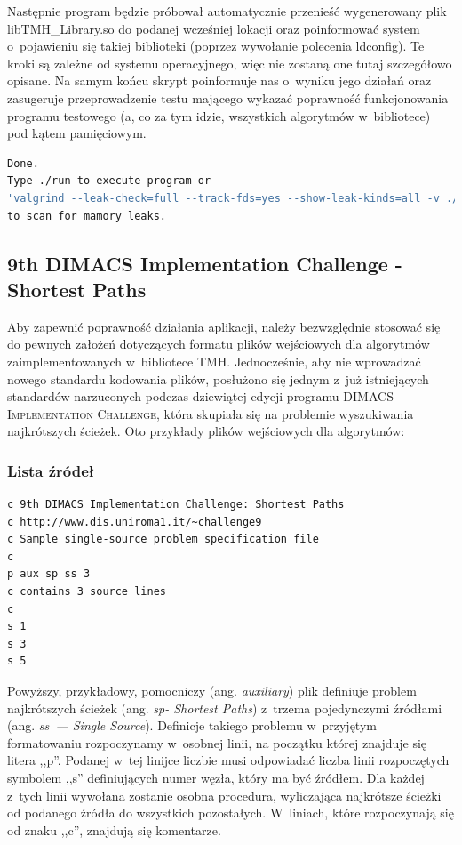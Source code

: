 Następnie program będzie próbował automatycznie przenieść wygenerowany plik \textsf{libTMH\_Library.so} do podanej wcześniej lokacji oraz poinformować system o~pojawieniu się takiej biblioteki (poprzez wywołanie polecenia \textsf{ldconfig}).
Te kroki są zależne od systemu operacyjnego, więc nie zostaną one tutaj szczegółowo opisane.
Na samym końcu skrypt poinformuje nas o~wyniku jego działań oraz zasugeruje przeprowadzenie testu mającego wykazać poprawność funkcjonowania programu testowego (a, co za tym idzie, wszystkich algorytmów w~bibliotece) pod kątem pamięciowym.

\small
\begin{lstlisting}[language=bash]
Done.
Type ./run to execute program or 
'valgrind --leak-check=full --track-fds=yes --show-leak-kinds=all -v ./run' 
to scan for mamory leaks.
\end{lstlisting}
\normalsize



\subsection{9th DIMACS Implementation Challenge - Shortest Paths}



Aby zapewnić poprawność działania aplikacji, należy bezwzględnie stosować się do pewnych założeń dotyczących formatu plików wejściowych dla algorytmów zaimplementowanych w~bibliotece \textsc{TMH}.
Jednocześnie, aby nie wprowadzać nowego standardu kodowania plików, posłużono się jednym z~już istniejących standardów narzuconych podczas dziewiątej edycji programu \textsc{DIMACS Implementation Challenge}, która skupiała się na problemie wyszukiwania najkrótszych ścieżek.
Oto przykłady plików wejściowych dla algorytmów:


\subsubsection{Lista źródeł}
\label{sub:fileWithSourceList}


\small
\begin{lstlisting}[language=bash]
c 9th DIMACS Implementation Challenge: Shortest Paths
c http://www.dis.uniroma1.it/~challenge9
c Sample single-source problem specification file
c
p aux sp ss 3
c contains 3 source lines
c
s 1
s 3
s 5

\end{lstlisting}
\normalsize

Powyższy, przykładowy, pomocniczy (ang. \textit{auxiliary}) plik definiuje problem najkrótszych ścieżek (ang. \textit{sp- Shortest Paths}) z~trzema pojedynczymi źródłami (ang. \textit{ss~--- Single Source}).
Definicje takiego problemu w~przyjętym formatowaniu rozpoczynamy w~osobnej linii, na początku której znajduje się litera ,,p''.
Podanej w~tej linijce liczbie musi odpowiadać liczba linii rozpoczętych symbolem ,,s'' definiujących numer węzła, który ma być źródłem.
Dla każdej z~tych linii wywołana zostanie osobna procedura, wyliczająca najkrótsze ścieżki od podanego źródła do wszystkich pozostałych.
W~liniach, które rozpoczynają się od znaku ,,c'', znajdują się komentarze.

